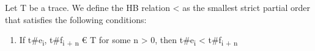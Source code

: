 \documentclass[landscape, a4paper]{article}
\begin{document}
\begin{minipage}[t]{0.19\linewidth}
	\raggedright
	\begin{betterlist}
		\item Let T be a trace. We define the HB relation < as the smallest strict partial order that satisfies the following conditions:
		\begin{enumerate}
			\item {} If t\#e\textsubscript{i}, t\#f\textsubscript{i + n} € T for some n > 0, then t\#e\textsubscript{i} < t\#f\textsubscript{i + n}

\end{enumerate}
\end{betterlist}
\end{minipage}
\end{document}
